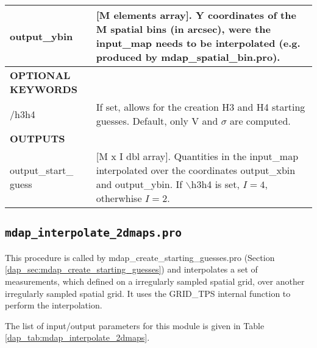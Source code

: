 \documentclass[11pt]{book}
\begin{document}
\begin{center}
\begin{longtable}{p{2.7cm}| p{11.1cm}}
%
output\_ybin &[M elements array]. Y coordinates of the M spatial bins (in arcsec), were the input\_map needs to be interpolated (e.g. produced by mdap\_spatial\_bin.pro).\\
\hline
{\bf OPTIONAL KEYWORDS} &  \\
/h3h4 & If set, allows for the creation H3 and H4 starting guesses. Default, only V and $\sigma$ are computed.\\
\hline
{\bf OUTPUTS} &  \\
%
output\_start\_ guess & [M x I dbl array]. Quantities in the input\_map interpolated over the coordinates output\_xbin and output\_ybin. If
                                        $\backslash$h3h4 is set, $I=4$, otherwhise $I=2$.\\ 
\hline
\end{longtable}
\end{center}





\subsection{{\tt mdap\_interpolate\_2dmaps.pro}}
\label{dap_sec:mdap_interpolate_2dmaps}

This procedure is called by mdap\_create\_starting\_guesses.pro
(Section \ref{dap_sec:mdap_create_starting_guesses}) and interpolates
a set of measurements, which defined on a irregularly sampled
spatial grid, over another irregularly sampled spatial grid.
It uses the GRID\_TPS internal function to perform the interpolation.

The list of input/output parameters for this module is given in Table
\ref{dap_tab:mdap_interpolate_2dmaps}.
\end{document}
